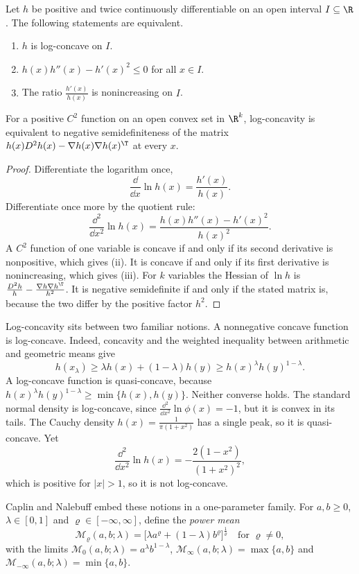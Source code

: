 \begin{lemma}\label{lem:B-lc-smooth}
Let $h$ be positive and twice continuously differentiable on an open interval $I \subseteq \R$. The following
statements are equivalent.
\begin{enumerate}[label=(\roman*)]
  \item $h$ is log-concave on $I$.
  \item $h(x)h''(x) - h'(x)^2 \leq 0$ for all $x \in I$.
  \item The ratio $\frac{h'(x)}{h(x)}$ is nonincreasing on $I$.
\end{enumerate}
For a positive $C^2$ function on an open convex set in $\R^k$, log-concavity is equivalent to negative
semidefiniteness of the matrix $h(x)D^2h(x) - \nabla h(x)\nabla h(x)^\T$ at every $x$.
\end{lemma}

\begin{proof}
Differentiate the logarithm once,
\[
  \frac{\dd}{\dd x}\ln h(x) = \frac{h'(x)}{h(x)}\text{.}
\]
Differentiate once more by the quotient rule:
\[
  \frac{\dd^2}{\dd x^2}\ln h(x) = \frac{h(x)h''(x) - h'(x)^2}{h(x)^2}\text{.}
\]
A $C^2$ function of one variable is concave if and only if its second derivative is nonpositive, which gives
(ii). It is concave if and only if its first derivative is nonincreasing, which gives (iii). For $k$ variables the
Hessian of $\ln h$ is $\frac{D^2h}{h} - \frac{\nabla h\nabla h^\T}{h^2}$. It is negative semidefinite if and only if
the stated matrix is, because the two differ by the positive factor $h^2$.
\end{proof}

Log-concavity sits between two familiar notions. A nonnegative concave function is log-concave. Indeed,
concavity and the weighted inequality between arithmetic and geometric means give
\[
  h(x_\lambda) \geq \lambda h(x) + (1 - \lambda)h(y) \geq h(x)^\lambda h(y)^{1 - \lambda}.
\]
A log-concave function is quasi-concave, because $h(x)^\lambda h(y)^{1 - \lambda} \geq \min\{h(x), h(y)\}$.
Neither converse holds. The standard normal density is log-concave, since $\frac{\dd^2}{\dd x^2}\ln\phi(x) = -1$,
but it is convex in its tails. The Cauchy density $h(x) = \frac{1}{\pi(1 + x^2)}$ has a single peak, so it is
quasi-concave. Yet
\[
  \frac{\dd^2}{\dd x^2}\ln h(x) = -\frac{2(1 - x^2)}{(1 + x^2)^2},
\]
which is positive for $|x| > 1$, so it is not log-concave.

Caplin and Nalebuff embed these notions in a one-parameter family. For $a, b \geq 0$, $\lambda \in [0, 1]$ and
$\varrho \in [-\infty, \infty]$, define the \emph{power mean}
\[
  \mathcal{M}_\varrho(a, b; \lambda) = \bigl[\lambda a^\varrho + (1 - \lambda)b^\varrho\bigr]^{\frac{1}{\varrho}}
  \quad\text{for } \varrho \neq 0,
\]
with the limits $\mathcal{M}_0(a, b; \lambda) = a^\lambda b^{1 - \lambda}$, $\mathcal{M}_{\infty}(a, b; \lambda) = \max\{a, b\}$
and $\mathcal{M}_{-\infty}(a, b; \lambda) = \min\{a, b\}$.

